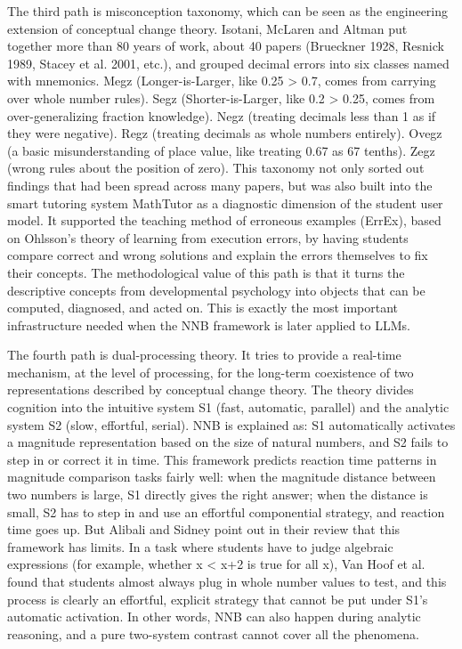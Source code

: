 The third path is misconception taxonomy, which can be seen as the engineering extension of conceptual change theory. Isotani, McLaren and Altman\cite{isotani2010} put together more than 80 years of work, about 40 papers (Brueckner 1928, Resnick 1989, Stacey et al. 2001, etc.), and grouped decimal errors into six classes named with mnemonics. Megz (Longer-is-Larger, like 0.25 > 0.7, comes from carrying over whole number rules). Segz (Shorter-is-Larger, like 0.2 > 0.25, comes from over-generalizing fraction knowledge). Negz (treating decimals less than 1 as if they were negative). Regz (treating decimals as whole numbers entirely). Ovegz (a basic misunderstanding of place value, like treating 0.67 as 67 tenths). Zegz (wrong rules about the position of zero). This taxonomy not only sorted out findings that had been spread across many papers, but was also built into the smart tutoring system MathTutor as a diagnostic dimension of the student user model. It supported the teaching method of erroneous examples (ErrEx), based on Ohlsson's\cite{ohlsson1996} theory of learning from execution errors, by having students compare correct and wrong solutions and explain the errors themselves to fix their concepts. The methodological value of this path is that it turns the descriptive concepts from developmental psychology into objects that can be computed, diagnosed, and acted on. This is exactly the most important infrastructure needed when the NNB framework is later applied to LLMs.

The fourth path is dual-processing theory. It tries to provide a real-time mechanism, at the level of processing, for the long-term coexistence of two representations described by conceptual change theory. The theory divides cognition into the intuitive system S1 (fast, automatic, parallel) and the analytic system S2 (slow, effortful, serial). NNB is explained as: S1 automatically activates a magnitude representation based on the size of natural numbers, and S2 fails to step in or correct it in time\cite{vamvakoussi2012}. This framework predicts reaction time patterns in magnitude comparison tasks fairly well: when the magnitude distance between two numbers is large, S1 directly gives the right answer; when the distance is small, S2 has to step in and use an effortful componential strategy, and reaction time goes up. But Alibali and Sidney\cite{alibali2015} point out in their review that this framework has limits. In a task where students have to judge algebraic expressions (for example, whether x < x+2 is true for all x), Van Hoof et al.\cite{van2015} found that students almost always plug in whole number values to test, and this process is clearly an effortful, explicit strategy that cannot be put under S1's automatic activation. In other words, NNB can also happen during analytic reasoning, and a pure two-system contrast cannot cover all the phenomena.

